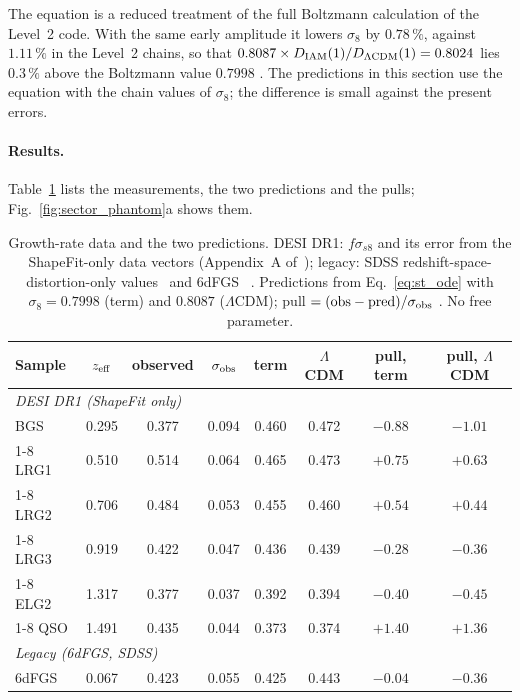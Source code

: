 The equation is a reduced treatment of the full Boltzmann calculation of the Level~2 code. With the same early amplitude it lowers $\sigma_8$ by
$0.78\,\%$, against $1.11\,\%$ in the Level~2 chains, so that $0.8087\times D_{\rm IAM}(1)/D_{\Lambda\rm CDM}(1)=0.8024$ lies $0.3\,\%$ above the Boltzmann
value $0.7998$ \calc. The predictions in this section use the equation with the chain values of $\sigma_8$; the difference is small against the present
errors.

\paragraph{Results.} Table~\ref{tab:st_fsig8} lists the measurements, the two predictions and the pulls; Fig.~\ref{fig:sector_phantom}a shows them.
\begin{table}[htbp]\centering\small
\caption{Growth-rate data and the two predictions. DESI DR1: $f\sigma_{s8}$ and its error from the ShapeFit-only data vectors (Appendix~A of~\cite{DESI2024V}); legacy: SDSS redshift-space-distortion-only values~\cite{Alam2021} and 6dFGS~\cite{Beutler2012} \observed. Predictions from Eq.~\eqref{eq:st_ode} with $\sigma_8=0.7998$ (term) and $0.8087$ ($\Lambda$CDM); pull $=({\rm obs}-{\rm pred})/\sigma_{\rm obs}$ \calc. No free parameter.}\label{tab:st_fsig8}
\begin{tabular}{lccccccc}\toprule
Sample & $z_{\rm eff}$ & observed & $\sigma_{\rm obs}$ & term & $\Lambda$CDM & pull, term & pull, $\Lambda$CDM\\\midrule
\multicolumn{8}{l}{\emph{DESI DR1 (ShapeFit only)}}\\
BGS & 0.295 & 0.377 & 0.094 & 0.460 & 0.472 & $-0.88$ & $-1.01$\\\cmidrule(lr){1-8}
LRG1 & 0.510 & 0.514 & 0.064 & 0.465 & 0.473 & $+0.75$ & $+0.63$\\\cmidrule(lr){1-8}
LRG2 & 0.706 & 0.484 & 0.053 & 0.455 & 0.460 & $+0.54$ & $+0.44$\\\cmidrule(lr){1-8}
LRG3 & 0.919 & 0.422 & 0.047 & 0.436 & 0.439 & $-0.28$ & $-0.36$\\\cmidrule(lr){1-8}
ELG2 & 1.317 & 0.377 & 0.037 & 0.392 & 0.394 & $-0.40$ & $-0.45$\\\cmidrule(lr){1-8}
QSO & 1.491 & 0.435 & 0.044 & 0.373 & 0.374 & $+1.40$ & $+1.36$\\\midrule
\multicolumn{8}{l}{\emph{Legacy (6dFGS, SDSS)}}\\
6dFGS & 0.067 & 0.423 & 0.055 & 0.425 & 0.443 & $-0.04$ & $-0.36$\\

\end{tabular}
\end{table}

